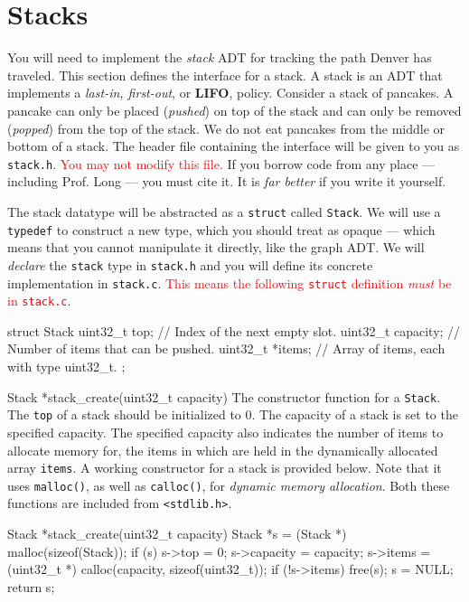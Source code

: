 \section{Stacks}

You will need to implement the \emph{stack} ADT for tracking the path
Denver has traveled. This section defines the interface for a stack. A
stack is an ADT that implements a \emph{last-in, first-out}, or
\textbf{LIFO}, policy. Consider a stack of pancakes. A pancake can only
be placed (\emph{pushed}) on top of the stack and can only be removed
(\emph{popped}) from the top of the stack. We do not eat pancakes from
the middle or bottom of a stack. The header file containing the
interface will be given to you as \texttt{stack.h}. \textcolor{red}{You
may not modify this file.} If you borrow code from any place ---
including Prof. Long --- you must cite it. It is \emph{far better} if
you write it yourself.

The stack datatype will be abstracted as a \texttt{struct} called
\texttt{Stack}. We will use a \texttt{typedef} to construct a new type,
which you should treat as opaque --- which means that you cannot
manipulate it directly, like the graph ADT. We will \emph{declare} the
\texttt{stack} type in \texttt{stack.h} and you will define its concrete
implementation in \texttt{stack.c}. \textcolor{red}{This means the
following \texttt{struct} definition \emph{must} be in
\texttt{stack.c}}.

\begin{clisting}{}
struct Stack {
    uint32_t top;       // Index of the next empty slot.
    uint32_t capacity;  // Number of items that can be pushed.
    uint32_t *items;    // Array of items, each with type uint32_t.
};
\end{clisting}

\begin{funcdoc}{Stack *stack\_create(uint32\_t capacity)}
  The constructor function for a \texttt{Stack}. The \texttt{top} of a
  stack should be initialized to 0. The capacity of a stack is set to the
  specified capacity. The specified capacity also indicates the number of
  items to allocate memory for, the items in which are held in the
  dynamically allocated array \texttt{items}. A working constructor for a
  stack is provided below. Note that it uses \texttt{malloc()}, as well
  as \texttt{calloc()}, for \emph{dynamic memory allocation}. Both these
  functions are included from \texttt{<stdlib.h>}.

  \begin{clisting}{}
Stack *stack_create(uint32_t capacity) {
    Stack *s = (Stack *) malloc(sizeof(Stack));
    if (s) {
        s->top = 0;
        s->capacity = capacity;
        s->items = (uint32_t *) calloc(capacity, sizeof(uint32_t));
        if (!s->items) {
            free(s);
            s = NULL;
        }
    }
    return s;
}
  \end{clisting}
\end{funcdoc}

